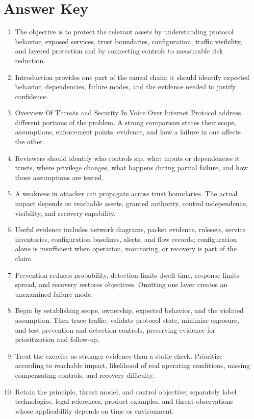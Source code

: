 \documentclass[11pt,letterpaper]{article}
\begin{document}
\section*{Answer Key}
\begin{enumerate}
\item The objective is to protect the relevant assets by understanding protocol behavior, exposed services, trust boundaries, configuration, traffic visibility, and layered protection and by connecting controls to measurable risk reduction.
\item Introduction provides one part of the causal chain: it should identify expected behavior, dependencies, failure modes, and the evidence needed to justify confidence.
\item Overview Of Threats and Security In Voice Over Internet Protocol address different portions of the problem. A strong comparison states their scope, assumptions, enforcement points, evidence, and how a failure in one affects the other.
\item Reviewers should identify who controls sip, what inputs or dependencies it trusts, where privilege changes, what happens during partial failure, and how those assumptions are tested.
\item A weakness in attacker can propagate across trust boundaries. The actual impact depends on reachable assets, granted authority, control independence, visibility, and recovery capability.
\item Useful evidence includes network diagrams, packet evidence, rulesets, service inventories, configuration baselines, alerts, and flow records; configuration alone is insufficient when operation, monitoring, or recovery is part of the claim.
\item Prevention reduces probability, detection limits dwell time, response limits spread, and recovery restores objectives. Omitting one layer creates an unexamined failure mode.
\item Begin by establishing scope, ownership, expected behavior, and the violated assumption. Then trace traffic, validate protocol state, minimize exposure, and test prevention and detection controls, preserving evidence for prioritization and follow-up.
\item Treat the exercise as stronger evidence than a static check. Prioritize according to reachable impact, likelihood of real operating conditions, missing compensating controls, and recovery difficulty.
\item Retain the principle, threat model, and control objective; separately label technologies, legal references, product examples, and threat observations whose applicability depends on time or environment.
\end{enumerate}
\end{document}
